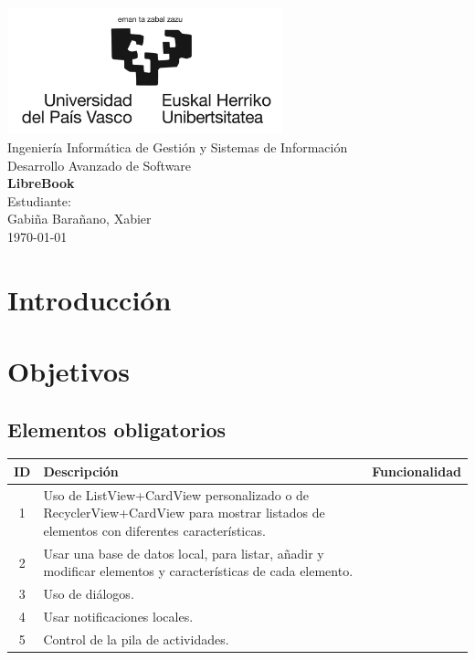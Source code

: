 \documentclass[a4paper,12pt]{report}
\begin{document}
  \begin{titlepage}
      \centering
      \includegraphics[width=0.6\textwidth]{./.img/logo.jpg}\\
      \vspace{1cm}
      \Large Ingeniería Informática de Gestión y Sistemas de Información\\
      \vspace{3cm}
      \Huge Desarrollo Avanzado de Software\\
      \vspace{0.5cm}
      \huge \textbf{LibreBook}\\
      \vspace{7.5cm}
      \Large Estudiante:\\
      \vspace{0.2cm}
      \large Gabiña Barañano, Xabier\\
      \vspace{1cm}
      \vfill
      \today
  \end{titlepage}
  \tableofcontents
  \listoffigures
  \listoftables
  \lstlistoflistings
  \chapter{Introducción}
  \chapter{Objetivos}
    \section{Elementos obligatorios}
    \begin{longtable}{|c|p{7.5cm}|p{7.5cm}|}
      \hline
      \textbf{ID} & \textbf{Descripción} & \textbf{Funcionalidad}\\
      \hline
      \endhead
      1 & Uso de ListView+CardView personalizado o de RecyclerView+CardView para mostrar listados de elementos con diferentes características. & \\
      \hline
      2 & Usar una base de datos local, para listar, añadir y modificar elementos y características de cada elemento. & \\
      \hline
      3 & Uso de diálogos. & \\
      \hline
      4 & Usar notificaciones locales. & \\
      \hline
      5 & Control de la pila de actividades. & \\
      \hline
    \end{longtable}
\end{document}
